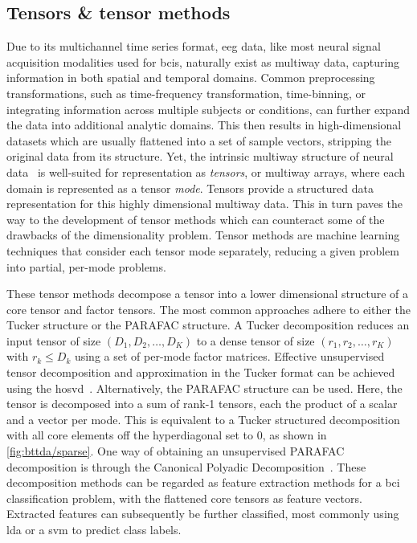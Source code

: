 \documentclass[10pt]{iopart}
\begin{document}
\subsection{Tensors \& tensor methods}

Due to its multichannel time series format, \ac{eeg} data, like most neural
signal acquisition modalities used for \acp{bci}, naturally exist as multiway data,
capturing information in both spatial and temporal domains.
Common preprocessing transformations, such as time-frequency transformation,
time-binning, or integrating information across multiple subjects or conditions,
can further expand the data into additional analytic domains.
This then results in high-dimensional datasets which are usually flattened into a
set of sample vectors, stripping the original data from its structure.
Yet, the intrinsic multiway structure of neural data~\cite{Erol2022} is
well-suited for representation as \emph{tensors}, or multiway arrays, where
each domain is represented as a tensor \emph{mode}.
Tensors provide a structured data representation for this highly dimensional
multiway data.
This in turn paves the way to the development of tensor methods which can
counteract some of the drawbacks of the dimensionality problem.
Tensor methods are machine learning techniques that consider each tensor mode
separately, reducing a given problem into partial, per-mode problems.

These tensor methods decompose a tensor into a lower dimensional structure of a
core tensor and factor tensors.
The most common approaches adhere to either the Tucker structure or the PARAFAC
structure.
A Tucker decomposition reduces an input tensor of size $(D_1,D_2,\ldots,D_K)$ to
a dense tensor of size $(r_1,r_2,\ldots,r_K)$ with $r_k \leq D_k$ using a
set of per-mode factor matrices.
Effective unsupervised tensor decomposition and approximation in the Tucker format can be achieved
using the \ac{hosvd}~\cite{DeLathauwer2000,SoleCasals2018}.
Alternatively, the PARAFAC structure can be used.
Here, the tensor is decomposed into a sum of rank-1 tensors, each the product
of a scalar and a vector per mode.
This is equivalent to a Tucker structured decomposition with all core elements
off the hyperdiagonal set to 0, as shown in \cref{fig:bttda/sparse}.
One way of obtaining an unsupervised PARAFAC decomposition is through the Canonical Polyadic
Decomposition~\cite{Hitchcock1927,Nazarpour2006}.
These decomposition methods can be regarded as feature extraction methods for a
\ac{bci} classification problem, with the flattened core tensors as feature vectors.
Extracted features can subsequently be further classified, most commonly
using \ac{lda} or a \ac{svm} to predict class labels.
\end{document}
